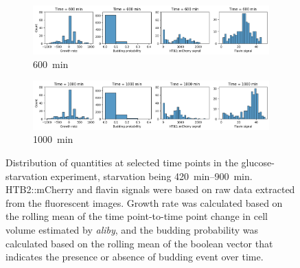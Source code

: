 \begin{figure}
  \begin{subfigure}[htpb]{0.9\textwidth}
   \centering
   \includegraphics[width=\textwidth]{19972_distribs_0600}
   \caption{
     \SI{600}{\minute}
   }
   \label{fig:biology-starvation-distribs-0600}
  \end{subfigure}

  \begin{subfigure}[htpb]{0.9\textwidth}
   \centering
   \includegraphics[width=\textwidth]{19972_distribs_1000}
   \caption{
     \SI{1000}{\minute}
   }
   \label{fig:biology-starvation-distribs-1000}
  \end{subfigure}

  \caption{
    Distribution of quantities at selected time points in the glucose-starvation experiment, starvation being \SIrange{420}{900}{\minute}.
    HTB2::mCherry and flavin signals were based on raw data extracted from the fluorescent images.
    Growth rate was calculated based on the rolling mean of the time point-to-time point change in cell volume estimated by \emph{aliby}, and the budding probability was calculated based on the rolling mean of the boolean vector that indicates the presence or absence of budding event over time.
  }
  \label{fig:biology-starvation-distribs}
\end{figure}


